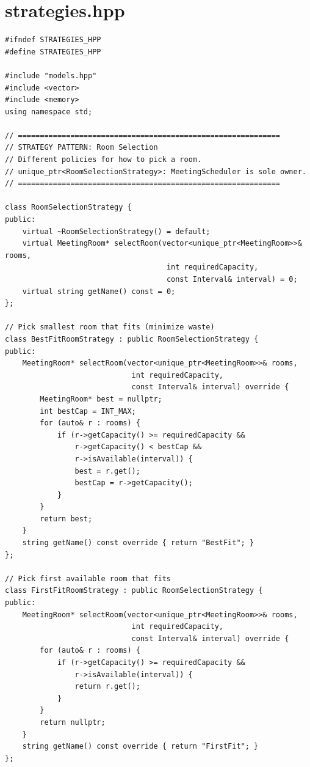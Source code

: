 \documentclass[11pt,a4paper]{article}
\begin{document}
\section{strategies.hpp}
\begin{lstlisting}[title={\texttt{strategies.hpp}}]
#ifndef STRATEGIES_HPP
#define STRATEGIES_HPP

#include "models.hpp"
#include <vector>
#include <memory>
using namespace std;

// ============================================================
// STRATEGY PATTERN: Room Selection
// Different policies for how to pick a room.
// unique_ptr<RoomSelectionStrategy>: MeetingScheduler is sole owner.
// ============================================================

class RoomSelectionStrategy {
public:
    virtual ~RoomSelectionStrategy() = default;
    virtual MeetingRoom* selectRoom(vector<unique_ptr<MeetingRoom>>& rooms,
                                     int requiredCapacity,
                                     const Interval& interval) = 0;
    virtual string getName() const = 0;
};

// Pick smallest room that fits (minimize waste)
class BestFitRoomStrategy : public RoomSelectionStrategy {
public:
    MeetingRoom* selectRoom(vector<unique_ptr<MeetingRoom>>& rooms,
                             int requiredCapacity,
                             const Interval& interval) override {
        MeetingRoom* best = nullptr;
        int bestCap = INT_MAX;
        for (auto& r : rooms) {
            if (r->getCapacity() >= requiredCapacity &&
                r->getCapacity() < bestCap &&
                r->isAvailable(interval)) {
                best = r.get();
                bestCap = r->getCapacity();
            }
        }
        return best;
    }
    string getName() const override { return "BestFit"; }
};

// Pick first available room that fits
class FirstFitRoomStrategy : public RoomSelectionStrategy {
public:
    MeetingRoom* selectRoom(vector<unique_ptr<MeetingRoom>>& rooms,
                             int requiredCapacity,
                             const Interval& interval) override {
        for (auto& r : rooms) {
            if (r->getCapacity() >= requiredCapacity &&
                r->isAvailable(interval)) {
                return r.get();
            }
        }
        return nullptr;
    }
    string getName() const override { return "FirstFit"; }
};


\end{lstlisting}
\end{document}
